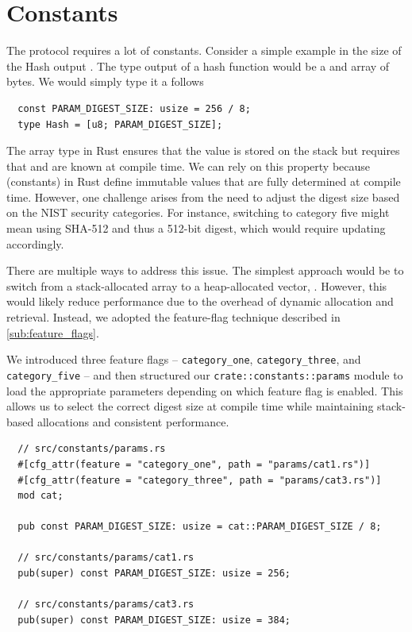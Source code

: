 \documentclass[11pt]{report}
\theoremstyle{definition}
\theoremstyle{plain}
\begin{document}
\section{Constants}\label{sub:constants}
The protocol requires a lot of constants. Consider a simple example in the size of the Hash output . The type output of a hash function would be a and array of bytes. We would simply type it a follows

\begin{verbatim}
  const PARAM_DIGEST_SIZE: usize = 256 / 8;
  type Hash = [u8; PARAM_DIGEST_SIZE];
\end{verbatim}

The \rust{[T; N]} array type in Rust ensures that the value is stored on the stack but requires that  and  are known at compile time. We can rely on this property because  (constants) in Rust define immutable values that are fully determined at compile time. However, one challenge arises from the need to adjust the digest size based on the NIST security categories. For instance, switching to category five might mean using SHA-512 and thus a 512-bit digest, which would require updating  accordingly.

There are multiple ways to address this issue. The simplest approach would be to switch from a stack-allocated array to a heap-allocated vector, . However, this would likely reduce performance due to the overhead of dynamic allocation and retrieval. Instead, we adopted the feature-flag technique described in \autoref{sub:feature_flags}.

We introduced three feature flags -- \texttt{category\_one}, \texttt{category\_three}, and \texttt{category\_five} -- and then structured our \texttt{crate::constants::params} module to load the appropriate parameters depending on which feature flag is enabled. This allows us to select the correct digest size at compile time while maintaining stack-based allocations and consistent performance.

\begin{verbatim}
  // src/constants/params.rs 
  #[cfg_attr(feature = "category_one", path = "params/cat1.rs")]
  #[cfg_attr(feature = "category_three", path = "params/cat3.rs")]
  mod cat; 

  pub const PARAM_DIGEST_SIZE: usize = cat::PARAM_DIGEST_SIZE / 8;

  // src/constants/params/cat1.rs
  pub(super) const PARAM_DIGEST_SIZE: usize = 256;

  // src/constants/params/cat3.rs
  pub(super) const PARAM_DIGEST_SIZE: usize = 384;
\end{verbatim}
\end{document}
